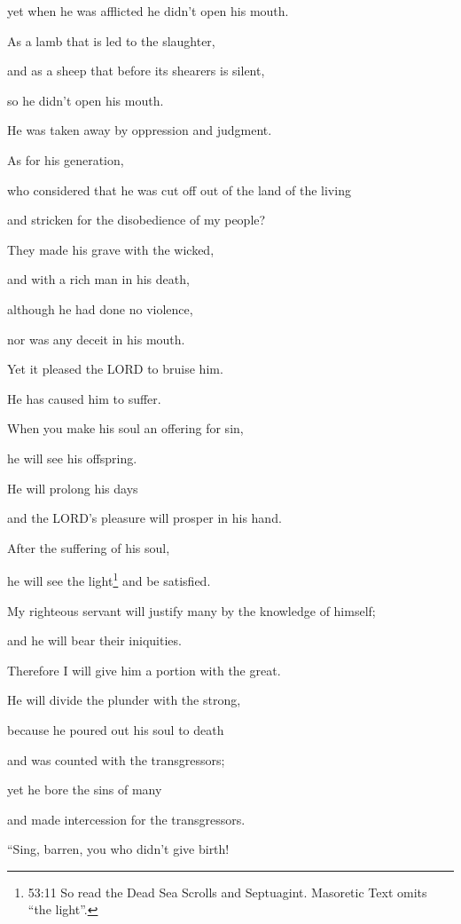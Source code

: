 yet when he was afflicted he didn’t open his mouth.

As a lamb that is led to the slaughter,

and as a sheep that before its shearers is silent,

so he didn’t open his mouth.

\myverse{}He was taken away by oppression and judgment.

As for his generation,

who considered that he was cut off out of the land of the living

and stricken for the disobedience of my people?

\myverse{}They made his grave with the wicked,

and with a rich man in his death,

although he had done no violence,

nor was any deceit in his mouth.


\vspace{\baselineskip} \myverse{}Yet it pleased the LORD to bruise him.

He has caused him to suffer.

When you make his soul an offering for sin,

he will see his offspring.

He will prolong his days

and the LORD’s pleasure will prosper in his hand.

\myverse{}After the suffering of his soul,

he will see the light\footnote{53:11 So read the Dead Sea Scrolls and Septuagint. Masoretic Text omits “the light”.} and be
satisfied.

My righteous servant will justify many by the knowledge of himself;

and he will bear their iniquities.

\myverse{}Therefore I will give him a portion with the great.

He will divide the plunder with the strong,

because he poured out his soul to death

and was counted with the transgressors;

yet he bore the sins of many

and made intercession for the transgressors.


\mychapter{} \myverse*{}“Sing, barren, you who didn’t give birth!

